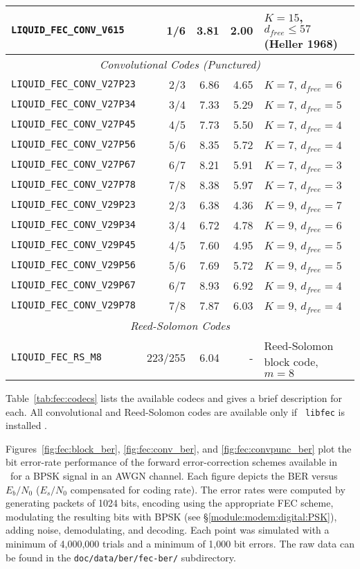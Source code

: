 \begin{table*}
{\begin{tabular*}{0.95\textwidth}{l@{\extracolsep{\fill}}rrrl}
{\tt LIQUID\_FEC\_CONV\_V615}   & 1/6     &  3.81 & 2.00 & $K=15$, $d_{free}\leq57$ (Heller 1968)\\\midrule
%
\multicolumn{5}{c}{{\em Convolutional Codes (Punctured)}}\\\midrule
{\tt LIQUID\_FEC\_CONV\_V27P23} & 2/3     &  6.86 & 4.65 & $K=7$, $d_{free}=6$\\
{\tt LIQUID\_FEC\_CONV\_V27P34} & 3/4     &  7.33 & 5.29 & $K=7$, $d_{free}=5$\\
{\tt LIQUID\_FEC\_CONV\_V27P45} & 4/5     &  7.73 & 5.50 & $K=7$, $d_{free}=4$\\
{\tt LIQUID\_FEC\_CONV\_V27P56} & 5/6     &  8.35 & 5.72 & $K=7$, $d_{free}=4$\\
{\tt LIQUID\_FEC\_CONV\_V27P67} & 6/7     &  8.21 & 5.91 & $K=7$, $d_{free}=3$\\
{\tt LIQUID\_FEC\_CONV\_V27P78} & 7/8     &  8.38 & 5.97 & $K=7$, $d_{free}=3$\\\midrule
%
{\tt LIQUID\_FEC\_CONV\_V29P23} & 2/3     &  6.38 & 4.36 & $K=9$, $d_{free}=7$\\
{\tt LIQUID\_FEC\_CONV\_V29P34} & 3/4     &  6.72 & 4.78 & $K=9$, $d_{free}=6$\\
{\tt LIQUID\_FEC\_CONV\_V29P45} & 4/5     &  7.60 & 4.95 & $K=9$, $d_{free}=5$\\
{\tt LIQUID\_FEC\_CONV\_V29P56} & 5/6     &  7.69 & 5.72 & $K=9$, $d_{free}=5$\\
{\tt LIQUID\_FEC\_CONV\_V29P67} & 6/7     &  8.93 & 6.92 & $K=9$, $d_{free}=4$\\
{\tt LIQUID\_FEC\_CONV\_V29P78} & 7/8     &  7.87 & 6.03 & $K=9$, $d_{free}=4$\\\midrule
% 
\multicolumn{5}{c}{{\em Reed-Solomon Codes}}\\\midrule
{\tt LIQUID\_FEC\_RS\_M8}       & 223/255 &  6.04 &    - & Reed-Solomon block code, $m=8$\\\bottomrule
\end{tabular*}
}
\end{table*}%
%
Table~\ref{tab:fec:codecs} lists the available codecs and gives a brief
description for each.
All convolutional and Reed-Solomon codes are available only if {\tt
libfec} is installed \cite{libfec:web}.

Figures~\ref{fig:fec:block_ber}, \ref{fig:fec:conv_ber}, and
\ref{fig:fec:convpunc_ber}
plot the bit error-rate performance of the forward
error-correction schemes available in \liquid\ for a BPSK signal
in an AWGN channel.
%
Each figure depicts the BER versus $E_b/N_0$
($E_s/N_0$ compensated for coding rate).
The error rates were computed by generating packets of 1024 bits,
encoding using the appropriate FEC scheme,
modulating the resulting bits with BPSK
(see \S\ref{module:modem:digital:PSK}),
adding noise, demodulating, and decoding.
Each point was simulated with a minimum of 4,000,000 trials
and a minimum of 1,000 bit errors.
The raw data can be found in the {\tt doc/data/ber/fec-ber/}
subdirectory.

